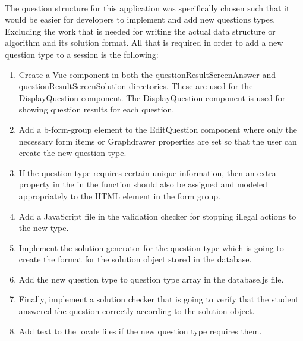 \\[11pt]
The question structure for this application was specifically chosen such that it would be easier for developers to implement and add new questions types. Excluding the work that is needed for writing the actual data structure or algorithm and its solution format. All that is required in order to add a new question type to a session is the following:
\begin{enumerate}
	\item Create a Vue component in both the questionResultScreenAnswer and questionResultScreenSolution directories. These are used for the DisplayQuestion component. The DisplayQuestion component is used for showing question results for each question.
	\item Add a b-form-group element to the EditQuestion component where only the necessary form items or Graphdrawer properties are set so that the user can create the new question type.
	\item If the question type requires certain unique information, then an extra property in the  in the  function should also be assigned and modeled appropriately to the HTML element in the form group.
	\item Add a JavaScript file in the validation checker for stopping illegal actions to the new type. 
	\item Implement the solution generator for the question type which is going to create the format for the solution object stored in the database.
	\item Add the new question type to question type array in the database.js file.
	\item Finally, implement a solution checker that is going to verify that the student answered the question correctly according to the solution object. 
	\item Add text to the locale files if the new question type requires them.
\end{enumerate}
